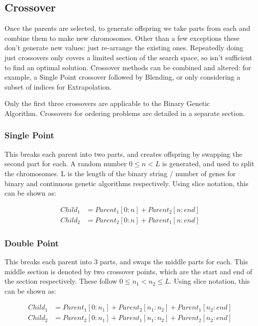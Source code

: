 \subsection{Crossover}
Once the parents are selected, to generate offspring we take parts from each and combine them to make new chromosomes. Other than a few exceptions these don't generate new values: just re-arrange the existing ones. Repeatedly doing just crossovers only covers a limited section of the search space, so isn't sufficient to find an optimal solution. Crossover methods can be combined and altered: for example, a Single Point crossover followed by Blending, or only considering a subset of indices for Extrapolation.

Only the first three crossovers are applicable to the Binary Genetic\\ Algorithm. Crossovers for ordering problems are detailed in a separate section.

\subsubsection{Single Point}
This breaks each parent into two parts, and creates offspring by swapping the second part for each. A random number \(0\leq n < L\) is generated, and used to split the chromosomes. L is the length of the binary string / number of genes for binary and continuous genetic algorithms respectively. Using slice notation, this can be shown as: 

\begin{align}
    Child_1 &= Parent_1[0:n] + Parent_2[n:end] \nonumber\\
    Child_2 &= Parent_2[0:n] + Parent_1[n:end] \nonumber
\end{align}

\subsubsection{Double Point}
This breaks each parent into 3 parts, and swaps the middle parts for each. This middle section is denoted by two crossover points, which are the start and end of the section respectively. These follow \(0\leq n_1 < n_2 \leq L\). Using slice notation, this can be shown as: 

\begin{align}
    Child_1 &= Parent_1[0:n_1] + Parent_2[n_1:n_2] +  Parent_1[n_2:end] \nonumber\\
    Child_2 &= Parent_2[0:n_1] + Parent_1[n_1:n_2] + Parent_2[n_2:end] \nonumber
\end{align}

